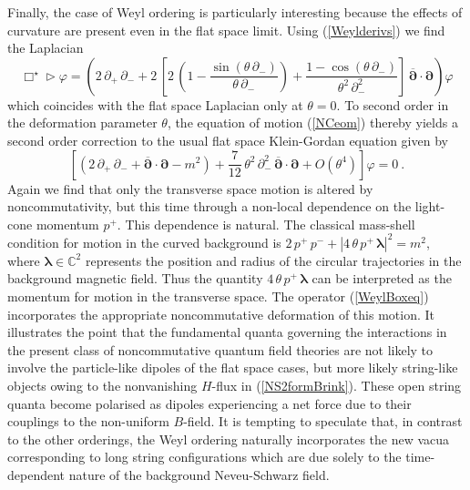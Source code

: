 \documentclass[11pt,a4paper]{article}
\newcommand{\1}{\mathbb{1}}
\newcommand{\mbf}[1]{{\boldsymbol {#1} }}
\def\mdell{{\mbf\partial}}
\newcommand{\complex}{{\mathbb C}} %
\begin{document}
Finally, the case of Weyl ordering is particularly interesting because
the effects of curvature are present even in the flat space
limit. Using (\ref{Weylderivs}) we find the Laplacian
\begin{equation}
\Box^\star\triangleright\varphi=\left(2\,\partial_+\,\partial_-
+2\,\left[2\,\left(1-\frac{\sin(\theta\,\partial_-)}
{\theta\,\partial_-}\right)+\frac{1-\cos(\theta\,\partial_-)}
{\theta^2\,\partial_-^2}\right]\,\overline{\mdell}\cdot\mdell
\right)\varphi
\label{WeylBoxeq}\end{equation}
which coincides with the flat space Laplacian only at $\theta=0$. To
second order in the deformation parameter $\theta$, the equation of
motion (\ref{NCeom}) thereby yields a second order correction to the
usual flat space Klein-Gordan equation given by
\begin{equation}
\left[\left(2\,\partial_+\,\partial_-+\overline{\mdell}\cdot\mdell-m^2
\right)+\mbox{$\frac7{12}$}\,\theta^2\,\partial_-^2\,\overline{\mdell}\cdot
\mdell+O\left(\theta^4\right)\right]\varphi=0 \ .
\label{KGeqcorr}\end{equation}
Again we find that only the transverse space motion is
altered by noncommutativity, but this time through a non-local
dependence on the light-cone momentum $p^+$. This dependence is
natural. The classical mass-shell condition for motion in the curved
background is $2\,p^+\,p^-+|4\,\theta\,p^+\,\mbf\lambda|^2=m^2$, where
$\mbf\lambda\in\complex^2$ represents the position and radius of the
circular trajectories in the background magnetic field. Thus the
quantity $4\,\theta\,p^+\,\mbf\lambda$ can be
interpreted as the momentum for motion in the transverse space. The
operator (\ref{WeylBoxeq}) incorporates the appropriate noncommutative
deformation of this motion. It illustrates the point that the
fundamental quanta governing the interactions in the present class of
noncommutative quantum field theories are not likely to involve the
particle-like dipoles of the flat space cases, but more likely
string-like objects owing to the nonvanishing $H$-flux in
(\ref{NS2formBrink}). These open string quanta become polarised as
dipoles experiencing a net force due to their couplings to the
non-uniform $B$-field. It is tempting to speculate that, in contrast
to the other orderings, the Weyl ordering naturally incorporates the
new vacua corresponding to long string configurations which are due
solely to the time-dependent nature of the background Neveu-Schwarz
field.
\end{document}
